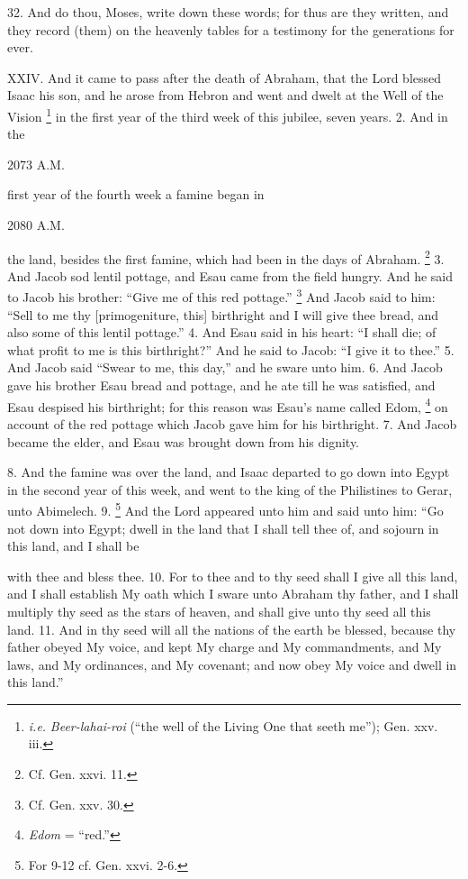 32. And do thou, Moses, write down these words; for thus are they written, and they record (them) on the heavenly tables for a testimony for the generations for ever.


XXIV. And it came to pass after the death of Abraham, that the Lord blessed Isaac his son, and he arose from Hebron and went and dwelt at the Well of the Vision \footnote{\emph{i.e.} \emph{Beer-lahai-roi} (``the well of the Living One that seeth me''); Gen. xxv. iii.} in the first year of the third week of this jubilee, seven years. 2. And in the

2073 A.M.

first year of the fourth week a famine began in

2080 A.M.

the land, besides the first famine, which had been in the days of Abraham. \footnote{Cf. Gen. xxvi. 11.} 3. And Jacob sod lentil pottage, and Esau came from the field hungry. And he said to Jacob his brother: ``Give me of this red pottage.'' \footnote{Cf. Gen. xxv. 30.} And Jacob said to him: ``Sell to me thy [primogeniture, this] birthright and I will give thee bread, and also some of this lentil pottage.'' 4. And Esau said in his heart: ``I shall die; of what profit to me is this birthright?'' And he said to Jacob: ``I give it to thee.'' 5. And Jacob said ``Swear to me, this day,'' and he sware unto him. 6. And Jacob gave his brother Esau bread and pottage, and he ate till he was satisfied, and Esau despised his birthright; for this reason was Esau's name called Edom, \footnote{\emph{Edom} = ``red.''} on account of the red pottage which Jacob gave him for his birthright. 7. And Jacob became the elder, and Esau was brought down from his dignity.


8. And the famine was over the land, and Isaac departed to go down into Egypt in the second year of this week, and went to the king of the Philistines to Gerar, unto Abimelech. 9. \footnote{For 9-12 cf. Gen. xxvi. 2-6.} And the Lord appeared unto him and said unto him: ``Go not down into Egypt; dwell in the land that I shall tell thee of, and sojourn in this land, and I shall be

with thee and bless thee. 10. For to thee and to thy seed shall I give all this land, and I shall establish My oath which I sware unto Abraham thy father, and I shall multiply thy seed as the stars of heaven, and shall give unto thy seed all this land. 11. And in thy seed will all the nations of the earth be blessed, because thy father obeyed My voice, and kept My charge and My commandments, and My laws, and My ordinances, and My covenant; and now obey My voice and dwell in this land.''

